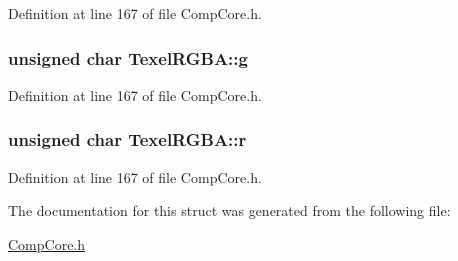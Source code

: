 Definition at line 167 of file Comp\-Core.\-h.

\hypertarget{struct_texel_r_g_b_a_a997ab15a88f5114bed505733605a3862}{
\subsubsection[{g}]{\setlength{\rightskip}{0pt plus 5cm}unsigned char Texel\-R\-G\-B\-A\-::g}}\label{struct_texel_r_g_b_a_a997ab15a88f5114bed505733605a3862}


Definition at line 167 of file Comp\-Core.\-h.

\hypertarget{struct_texel_r_g_b_a_a35804d005988bece75db0928273cd74d}{
\subsubsection[{r}]{\setlength{\rightskip}{0pt plus 5cm}unsigned char Texel\-R\-G\-B\-A\-::r}}\label{struct_texel_r_g_b_a_a35804d005988bece75db0928273cd74d}


Definition at line 167 of file Comp\-Core.\-h.



The documentation for this struct was generated from the following file\-:\begin{DoxyCompactItemize}
\item 
\hyperlink{_comp_core_8h}{Comp\-Core.\-h}\end{DoxyCompactItemize}

